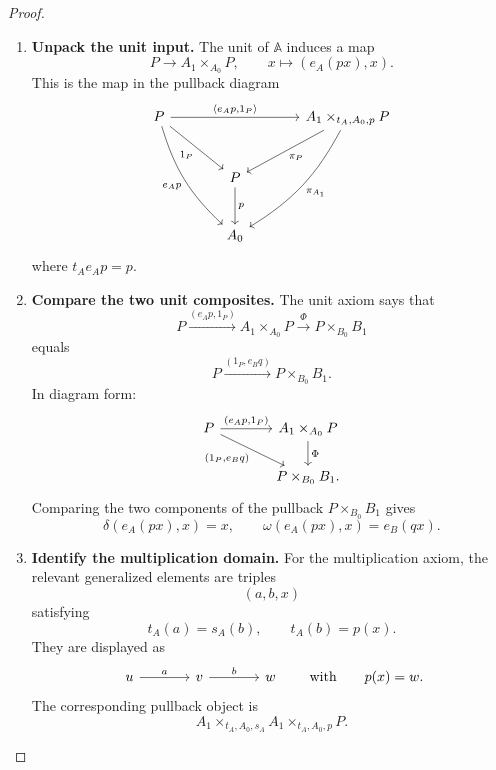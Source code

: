 \begin{proof}
    \leavevmode
    \begin{enumerate}
        \item \textbf{Unpack the unit input.} The unit of \(\mathbb A\) induces a map
        \[
            P\to A_1\times_{A_0}P,
            \qquad
            x\mapsto (e_A(px),x).
        \]
        This is the map in the pullback diagram
        \[
            \begin{tikzcd}[column sep=large, row sep=large]
                P
                    \arrow[rr, "{\langle e_Ap,1_P\rangle}"]
                    \arrow[dr, "1_P"']
                    \arrow[ddr, "e_Ap"', bend right=15]
                &
                &
                A_1\times_{t_A,A_0,p}P
                    \arrow[dl, "\pi_P"]
                    \arrow[ddl, "\pi_{A_1}", bend left=15]
                \\
                &
                P
                    \arrow[d, "p"]
                \\
                &
                A_0
            \end{tikzcd}
        \]
        where \(t_Ae_Ap=p\).

        \item \textbf{Compare the two unit composites.} The unit axiom says that
        \[
            P
            \xrightarrow{(e_Ap,1_P)}
            A_1\times_{A_0}P
            \xrightarrow{\Phi}
            P\times_{B_0}B_1
        \]
        equals
        \[
            P
            \xrightarrow{(1_P,e_Bq)}
            P\times_{B_0}B_1.
        \]
        In diagram form:
        \[
            \begin{tikzcd}[column sep=large]
                    P
                        \arrow[r, "{(e_Ap,1_P)}"]
                        \arrow[dr, "{(1_P,e_Bq)}"']
                &
                    A_1\times_{A_0}P
                        \arrow[d, "\Phi"]
                \\
                &
                    P\times_{B_0}B_1.
            \end{tikzcd}
        \]
        Comparing the two components of the pullback \(P\times_{B_0}B_1\) gives
        \[
            \delta(e_A(px),x)=x,
            \qquad
            \omega(e_A(px),x)=e_B(qx).
        \]

        \item \textbf{Identify the multiplication domain.} For the multiplication axiom, the relevant generalized elements are triples
        \[
            (a,b,x)
        \]
        satisfying
        \[
            t_A(a)=s_A(b),
            \qquad
            t_A(b)=p(x).
        \]
        They are displayed as
        \[
            \begin{tikzcd}[column sep=large]
                    u 
                        \arrow[r, "a"] 
                & 
                    v 
                        \arrow[r, "b"] 
                & 
                    w
            \end{tikzcd}
            \qquad
            \text{with}\qquad
            p(x)=w.
        \]
        The corresponding pullback object is
        \[
            A_1\times_{t_A,A_0,s_A}A_1\times_{t_A,A_0,p}P.
        \]


\end{enumerate}
\end{proof}
